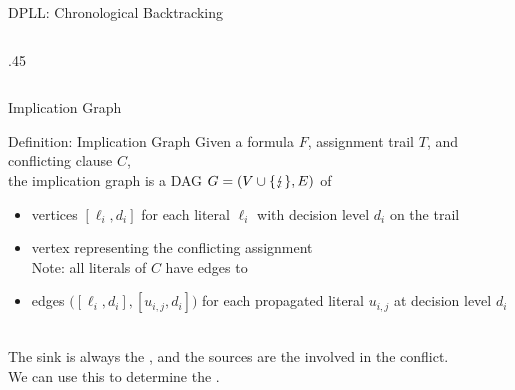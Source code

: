 \documentclass[t]{sdqbeamer}
\begin{document}
\begin{frame}{DPLL: Chronological Backtracking}
\begin{columns}[T]
\begin{column}{.45\textwidth}
\end{column}
\end{columns}
\end{frame}


\begin{frame}{Implication Graph}
\begin{blueblock}{Definition: Implication Graph}
Given a formula $F$, assignment trail $T$, and conflicting clause $C$,\\
the implication graph is a DAG $G=(V \cup \{ \text{\ensuremath{\lightning}} \},E)$ of \\[1ex]
\begin{itemize}\setlength{\itemsep}{1em}
	\item vertices $[\ell_i,d_i]$ for each literal $\ell_i$ with decision level $d_i$ on the trail
	\item vertex \blitz{} representing the conflicting assignment\\[1ex] Note: all literals of $C$ have edges to \blitz{}
	\item edges $\bigl([\ell_i, d_i], [u_{i,j}, d_i]\bigr)$ for each propagated literal $u_{i,j}$ at decision level $d_i$
\end{itemize}
\end{blueblock}~\\[1em]
The sink is always the , and the sources are the  involved in the conflict.\\[1ex]
We can use this to determine the .
\end{frame}
\end{document}
